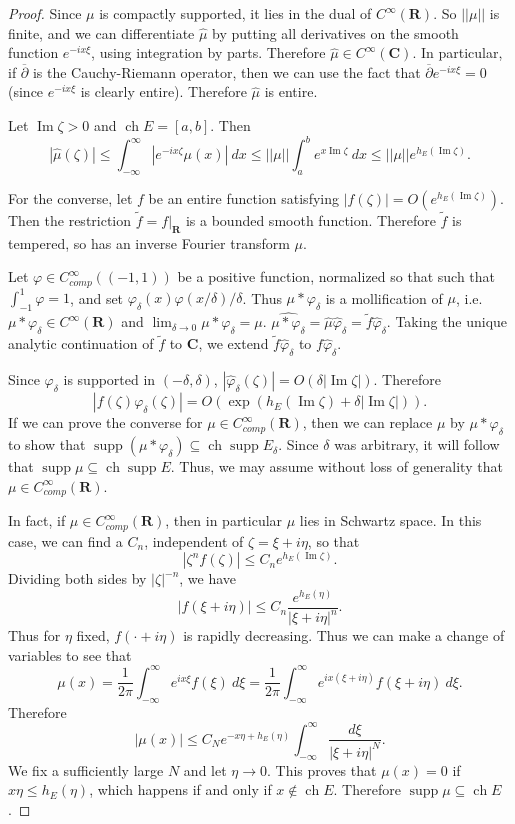 \documentclass[12pt]{report}
\newcommand{\RR}{\mathbf{R}}
\newcommand{\CC}{\mathbf{C}}
\DeclareMathOperator{\ch}{ch}
\DeclareMathOperator{\supp}{supp}
\newcommand{\dbar}{\overline \partial}
\renewcommand{\Im}{\operatorname{Im}}
\theoremstyle{definition}
\theoremstyle{remark}
\begin{document}
\begin{proof}
    Since $\mu$ is compactly supported, it lies in the dual of $C^\infty(\RR)$. So $||\mu||$ is finite, and we can differentiate $\hat \mu$ by putting all derivatives on the smooth function $e^{-ix\xi}$, using integration by parts. Therefore $\hat \mu \in C^\infty(\CC)$. In particular, if $\dbar$ is the Cauchy-Riemann operator, then we can use the fact that $\dbar e^{-ix\xi} = 0$ (since $e^{-i x\xi}$ is clearly entire). Therefore $\hat \mu$ is entire.

    Let $\Im \zeta > 0$ and $\ch E = [a, b]$. Then
$$|\hat \mu(\zeta)| \leq \int_{-\infty}^\infty |e^{-ix\zeta} \mu(x)| ~dx \leq ||\mu|| \int_a^b e^{x \Im \zeta} ~dx \leq ||\mu|| e^{h_E(\Im \zeta)}.$$

    For the converse, let $f$ be an entire function satisfying $|f(\zeta)| = O(e^{h_E(\Im \zeta)})$. Then the restriction $\tilde f = f|_\RR$ is a bounded smooth function. Therefore $\tilde f$ is tempered, so has an inverse Fourier transform $\mu$.

    Let $\varphi \in C^\infty_{comp}((-1, 1))$ be a positive function, normalized so that such that $\int_{-1}^1 \varphi = 1$, and set $\varphi_\delta(x) \varphi(x/\delta)/\delta$. Thus $\mu * \varphi_\delta$ is a mollification of $\mu$, i.e. $\mu * \varphi_\delta \in C^\infty(\RR)$ and $\lim_{\delta \to 0} \mu * \varphi_\delta = \mu$. $\widehat{\mu*\varphi_\delta} = \hat \mu  \hat \varphi_\delta = \tilde f \hat \varphi_\delta$. Taking the unique analytic continuation of $\tilde f$ to $\CC$, we extend $\tilde f \hat \varphi_\delta$ to $f \hat \varphi_\delta$.

    Since $\varphi_\delta$ is supported in $(-\delta, \delta)$, $|\hat \varphi_\delta(\zeta)| = O(\delta |\Im \zeta|)$. Therefore
$$|f(\zeta) \varphi_\delta(\zeta)| = O(\exp(h_E(\Im \zeta) + \delta|\Im \zeta|)).$$
    If we can prove the converse for $\mu \in C^\infty_{comp}(\RR)$, then we can replace $\mu$ by $\mu * \varphi_\delta$ to show that $\supp (\mu * \varphi_\delta) \subseteq \ch \supp E_\delta$. Since $\delta$ was arbitrary, it will follow that $\supp \mu \subseteq \ch \supp E$. Thus, we may assume without loss of generality that $\mu \in C^\infty_{comp}(\RR)$.

    In fact, if $\mu \in C^\infty_{comp}(\RR)$, then in particular $\mu$ lies in Schwartz space. In this case, we can find a $C_n$, independent of $\zeta = \xi + i\eta$, so that
$$|\zeta^n f(\zeta)| \leq C_n e^{h_E(\Im \zeta)}.$$
    Dividing both sides by $|\zeta|^{-n}$, we have
    $$|f(\xi + i \eta)| \leq C_n \frac{e^{h_E(\eta)}}{|\xi + i\eta|^n}.$$
    Thus for $\eta$ fixed, $f(\cdot + i\eta)$ is rapidly decreasing. Thus we can make a change of variables to see that
$$\mu(x) = \frac{1}{2\pi} \int_{-\infty}^\infty e^{ix\xi} f(\xi) ~d\xi = \frac{1}{2\pi} \int_{-\infty}^\infty e^{ix(\xi+i\eta)} f(\xi + i\eta) ~d\xi.$$
    Therefore
    $$|\mu(x)| \leq C_Ne^{-x\eta + h_E(\eta)} \int_{-\infty}^\infty \frac{d\xi}{|\xi + i\eta|^N}.$$
    We fix a sufficiently large $N$ and let $\eta \to 0$. This proves that $\mu(x) = 0$ if $x\eta \leq h_E(\eta)$, which happens if and only if $x \notin \ch E$. Therefore $\supp \mu \subseteq \ch E$.
\end{proof}
\end{document}
